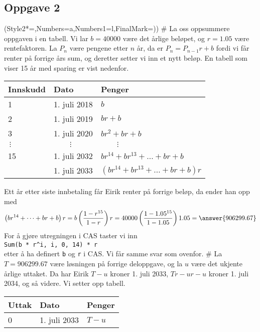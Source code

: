 \subsection*{Oppgave 2}
\begin{easylist}[enumerate]
	\ListProperties(Style2*=,Numbers=a,Numbers1=l,FinalMark={)})
	# La oss oppsummere oppgaven i en tabell.
	Vi lar $b = 40000$ være det årlige beløpet, og $r = 1.05$ være rentefaktoren.
	La $P_n$ være pengene etter $n$ år, da er $P_n = P_{n-1} r + b$ fordi vi får renter på forrige års sum, og deretter setter vi inn et nytt beløp.
	En tabell som viser 15 år med sparing er vist nedenfor.
	\begin{center}
		\begin{tabular}{lll}
			\textbf{Innskudd} & \textbf{Dato} & \textbf{Penger} \\ \hline
			1 & 1. juli 2018 & $b$ \\
			2 & 1. juli 2019 & $br + b$ \\
			3 & 1. juli 2020 & $br^2 + br + b$ \\
			$\, \vdots$ & $\qquad \vdots$ & $\qquad \vdots$ \\
			15 & 1. juli 2032 & $br^{14} + br^{13} + \dots + br + b$ \\
			 & 1. juli 2033 & $\left(br^{14} + br^{13} + \dots + br + b\right) r$ \\
		\end{tabular}
	\end{center}
	Ett år etter siste innbetaling får Eirik renter på forrige beløp,
	da ender han opp med
	\begin{equation*}
		\left(br^{14} + \dots + br + b\right)r = b\left(\frac{1 - r^{15}}{1 - r}\right)r 
		= 40000\left(\frac{1 - 1.05^{15}}{1 - 1.05}\right)1.05 = \answer{906299.67}
	\end{equation*}
	For å gjøre utregningen i CAS taster vi inn \\
	\verb|Sum(b * r^i, i, 0, 14) * r| \\
	etter å ha definert \verb|b| og \verb|r| i CAS. Vi får samme svar som ovenfor.
	# La $T = 906299.67$ være løsningen på forrige deloppgave, og la $u$ være det ukjente årlige uttaket.
	Da har Eirik $T-u$ kroner 1. juli 2033, $Tr - ur - u$ kroner 1. juli 2034, og så videre. Vi setter opp tabell.
	\begin{center}
		\begin{tabular}{lll}
			\textbf{Uttak} & \textbf{Dato} & \textbf{Penger} \\ \hline
			0 & 1. juli 2033 & $T - u$ \\

\end{tabular}
\end{center}
\end{easylist}
